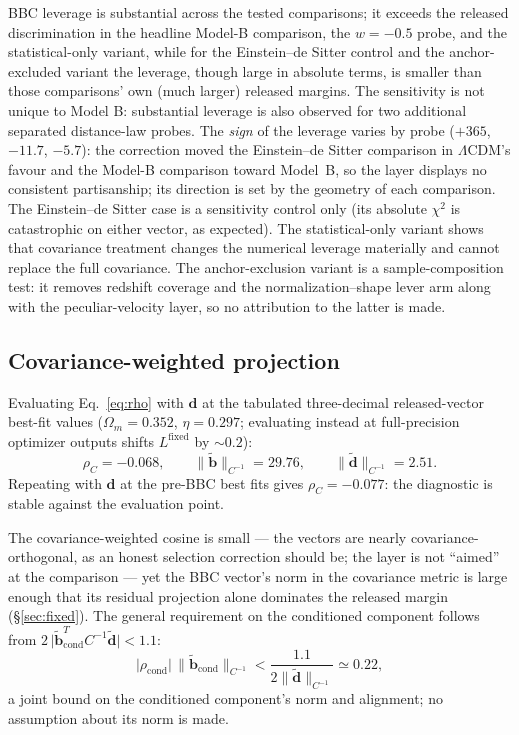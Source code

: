 \documentclass[11pt]{article}
\begin{document}
BBC leverage is substantial across the tested comparisons; it exceeds the
released discrimination in the headline Model-B comparison, the
$w = -0.5$ probe, and the statistical-only variant, while for the
Einstein--de Sitter control and the anchor-excluded variant the leverage,
though large in absolute terms, is smaller than those comparisons' own
(much larger) released margins. The sensitivity is not unique to Model B:
substantial leverage is also observed for two additional separated
distance-law probes. The \emph{sign} of the leverage varies by probe
($+365$, $-11.7$, $-5.7$): the correction moved the Einstein--de Sitter
comparison in $\Lambda$CDM's favour and the Model-B comparison toward
Model~B, so the layer displays no consistent partisanship; its direction
is set by the geometry of each comparison. The Einstein--de Sitter case
is a sensitivity control only (its absolute $\chi^2$ is catastrophic on
either vector, as expected). The statistical-only variant shows that
covariance treatment changes the numerical leverage materially and cannot
replace the full covariance. The anchor-exclusion variant is a
sample-composition test: it removes redshift coverage and the
normalization--shape lever arm along with the peculiar-velocity layer, so
no attribution to the latter is made.

\subsection{Covariance-weighted projection}
\label{sec:projection}

Evaluating Eq.~\eqref{eq:rho} with $\boldsymbol{d}$ at the tabulated
three-decimal released-vector best-fit values
($\Omega_m = 0.352$, $\eta = 0.297$; evaluating instead at full-precision
optimizer outputs shifts $L^{\mathrm{fixed}}$ by $\sim 0.2$):
\begin{equation}
\rho_C = -0.068, \qquad
\lVert\widetilde{\boldsymbol b}\rVert_{C^{-1}} = 29.76, \qquad
\lVert\widetilde{\boldsymbol d}\rVert_{C^{-1}} = 2.51 .
\label{eq:rhovals}
\end{equation}
Repeating with $\boldsymbol{d}$ at the pre-BBC best fits gives
$\rho_C = -0.077$: the diagnostic is stable against the evaluation point.

The covariance-weighted cosine is small --- the vectors are nearly
covariance-orthogonal, as an honest selection correction should be; the
layer is not ``aimed'' at the comparison --- yet the BBC vector's norm in
the covariance metric is large enough that its residual projection alone
dominates the released margin (\S\ref{sec:fixed}). The general
requirement on the conditioned component follows from
$2\,\lvert\widetilde{\boldsymbol b}_{\mathrm{cond}}^{T} C^{-1}
\widetilde{\boldsymbol d}\rvert < 1.1$:
\begin{equation}
\lvert\rho_{\mathrm{cond}}\rvert \,
\lVert\widetilde{\boldsymbol b}_{\mathrm{cond}}\rVert_{C^{-1}}
< \frac{1.1}{2\lVert\widetilde{\boldsymbol d}\rVert_{C^{-1}}}
\simeq 0.22 ,
\label{eq:condreq}
\end{equation}
a joint bound on the conditioned component's norm and alignment; no
assumption about its norm is made.
\end{document}
